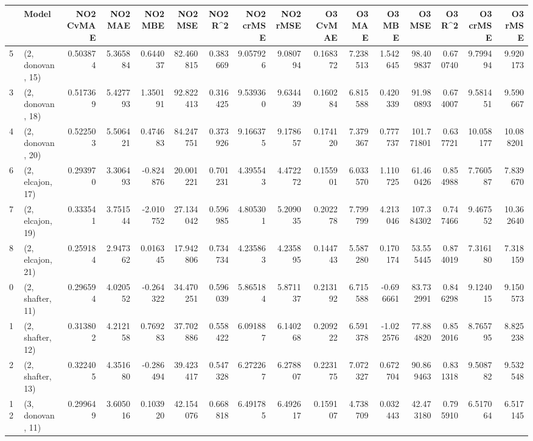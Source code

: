 \begin{tabular}{llrrrrrrrrrrrrrr}
\toprule
{} &             Model &  NO2 CvMAE &   NO2 MAE &   NO2 MBE &    NO2 MSE &   NO2 R\textasciicircum2 &  NO2 crMSE &  NO2 rMSE &  O3 CvMAE &    O3 MAE &    O3 MBE &      O3 MSE &    O3 R\textasciicircum2 &   O3 crMSE &    O3 rMSE \\
\midrule
5  &  (2, donovan, 15) &   0.503874 &  5.365884 &  0.644037 &  82.460815 &  0.383669 &   9.057926 &  9.080794 &  0.168372 &  7.238513 &  1.542645 &   98.409837 &  0.670740 &   9.799494 &   9.920173 \\
3  &  (2, donovan, 18) &   0.517369 &  5.427793 &  1.350191 &  92.822413 &  0.316425 &   9.539360 &  9.634439 &  0.160284 &  6.815588 &  0.420339 &   91.980893 &  0.674007 &   9.581451 &   9.590667 \\
4  &  (2, donovan, 20) &   0.522503 &  5.506421 &  0.474683 &  84.247751 &  0.373926 &   9.166375 &  9.178657 &  0.174120 &  7.379367 &  0.777737 &  101.771801 &  0.637721 &  10.058177 &  10.088201 \\
6  &  (2, elcajon, 17) &   0.293970 &  3.306493 & -0.824876 &  20.001221 &  0.701231 &   4.395543 &  4.472272 &  0.155901 &  6.033570 &  1.110725 &   61.460426 &  0.854988 &   7.760587 &   7.839670 \\
7  &  (2, elcajon, 19) &   0.333541 &  3.751544 & -2.010752 &  27.134042 &  0.596985 &   4.805301 &  5.209035 &  0.202278 &  7.799799 &  4.213046 &  107.384302 &  0.747466 &   9.467552 &  10.362640 \\
8  &  (2, elcajon, 21) &   0.259184 &  2.947362 &  0.016345 &  17.942806 &  0.734734 &   4.235863 &  4.235895 &  0.144743 &  5.587280 &  0.170174 &   53.555445 &  0.874019 &   7.316180 &   7.318159 \\
0  &  (2, shafter, 11) &   0.296594 &  4.020552 & -0.264322 &  34.470251 &  0.596039 &   5.865184 &  5.871137 &  0.213192 &  6.715588 & -0.696661 &   83.732991 &  0.846298 &   9.124015 &   9.150573 \\
1  &  (2, shafter, 12) &   0.313802 &  4.212158 &  0.769283 &  37.702886 &  0.558422 &   6.091887 &  6.140268 &  0.209222 &  6.591378 & -1.022576 &   77.884820 &  0.852016 &   8.765795 &   8.825238 \\
2  &  (2, shafter, 13) &   0.322405 &  4.351680 & -0.286494 &  39.423417 &  0.547328 &   6.272267 &  6.278807 &  0.223175 &  7.072327 &  0.672704 &   90.869463 &  0.831318 &   9.508782 &   9.532548 \\
12 &  (3, donovan, 11) &   0.299649 &  3.605016 &  0.103920 &  42.154076 &  0.668818 &   6.491785 &  6.492617 &  0.159107 &  4.738709 &  0.032443 &   42.473180 &  0.795910 &   6.517064 &   6.517145 \\

\end{tabular}
